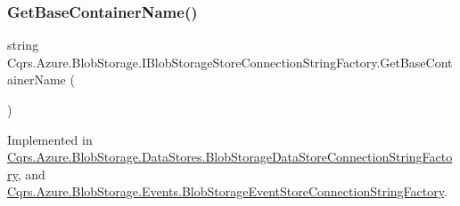 \subsubsection{\texorpdfstring{Get\+Base\+Container\+Name()}{GetBaseContainerName()}}
{\footnotesize\ttfamily string Cqrs.\+Azure.\+Blob\+Storage.\+I\+Blob\+Storage\+Store\+Connection\+String\+Factory.\+Get\+Base\+Container\+Name (\begin{DoxyParamCaption}{ }\end{DoxyParamCaption})}



Implemented in \hyperlink{classCqrs_1_1Azure_1_1BlobStorage_1_1DataStores_1_1BlobStorageDataStoreConnectionStringFactory_af9d95c58f5f275d9c9c1575b3d147bdb_af9d95c58f5f275d9c9c1575b3d147bdb}{Cqrs.\+Azure.\+Blob\+Storage.\+Data\+Stores.\+Blob\+Storage\+Data\+Store\+Connection\+String\+Factory}, and \hyperlink{classCqrs_1_1Azure_1_1BlobStorage_1_1Events_1_1BlobStorageEventStoreConnectionStringFactory_a0e6aadced9c9a583884899a4c9de2f1a_a0e6aadced9c9a583884899a4c9de2f1a}{Cqrs.\+Azure.\+Blob\+Storage.\+Events.\+Blob\+Storage\+Event\+Store\+Connection\+String\+Factory}.

